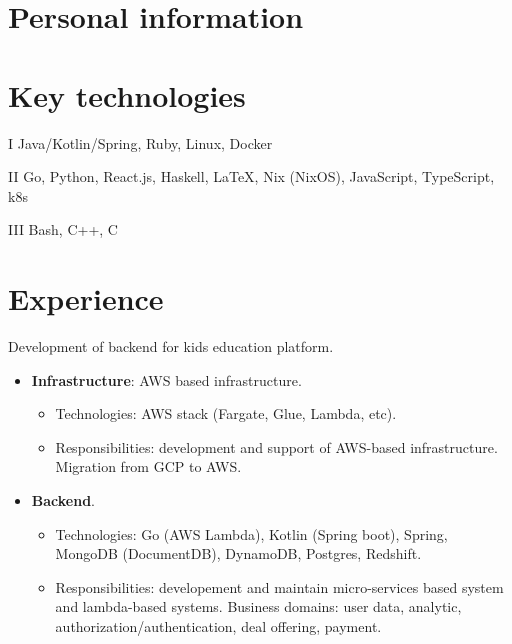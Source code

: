 \documentclass{cv}
\begin{document}
\iftrue

	\section{Personal information}




\fi


\section{Key technologies}

\begin{cvblock}{I}
	Java/Kotlin/Spring, Ruby, Linux, Docker
\end{cvblock}

\begin{cvblock}{II}
	Go, Python, React.js, Haskell, \LaTeX, Nix (NixOS), JavaScript, TypeScript, k8s
\end{cvblock}

\begin{cvblock}{III}
	Bash, C++, C
\end{cvblock}


\section{Experience}

\begin{cvblock}{%
		}

	Development of backend for kids education platform.

	\begin{itemize}
		\item \textbf{Infrastructure}: AWS based infrastructure.
		      \begin{itemize}
			      \item Technologies: AWS stack (Fargate, Glue, Lambda, etc).
			      \item Responsibilities: development and support of AWS-based infrastructure. Migration from GCP to AWS.
		      \end{itemize}
		\item \textbf{Backend}.
		      \begin{itemize}
			      \item Technologies: Go (AWS Lambda), Kotlin (Spring boot), Spring, MongoDB (DocumentDB), DynamoDB, Postgres, Redshift.
			      \item Responsibilities: developement and maintain micro-services based system and lambda-based systems. Business domains:
			            user data, analytic, authorization/authentication, deal offering, payment.
		      \end{itemize}
	\end{itemize}
\end{cvblock}
\end{document}
